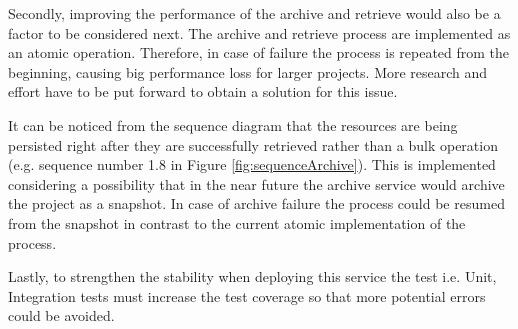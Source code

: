 Secondly, improving the performance of the archive and retrieve would also be a factor to be considered next. The archive and retrieve process are implemented as
an atomic operation. Therefore, in case of failure the process is repeated from the beginning, causing big performance loss for larger projects. More research and effort
have to be put forward to obtain a solution for this issue. 

It can be noticed from the sequence diagram that the resources are being persisted right after they are successfully retrieved rather than a bulk operation
(e.g. sequence number 1.8 in Figure \ref{fig:sequenceArchive}). This
is implemented considering a possibility that in the near future the archive service would archive the project as a snapshot. In case of archive failure the process
could be resumed from the snapshot in contrast to the current atomic implementation of the process.

Lastly, to strengthen the stability when deploying this service the test i.e. Unit, Integration tests must increase the test coverage so that more potential
errors could be avoided. 


